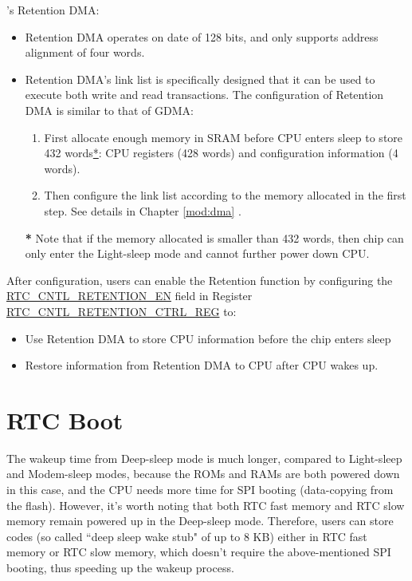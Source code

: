 \documentclass[main\_\_EN.tex]{subfiles}
\begin{document}
\chipname{}'s Retention DMA:

\begin{itemize}
    \item Retention DMA operates on date of 128 bits, and only supports address alignment of four words.
    \item Retention DMA's link list is specifically designed that it can be used to execute both write and read transactions. The configuration of Retention DMA is similar to that of GDMA:
    \begin{enumerate}
        \item First allocate enough memory in SRAM before CPU enters sleep to store 432 words\hyperref[dma-note1]{*}: CPU registers (428 words) and configuration information (4 words).
        \item Then configure the link list according to the memory allocated in the first step. See details in Chapter \ref{mod:dma} \textit{}.
    \end{enumerate}


\begin{tiplisting}\label{dma-note1}
\textbf{*} Note that if the memory allocated is smaller than 432 words, then chip can only enter the Light-sleep mode and cannot further power down CPU.
\end{tiplisting}
\end{itemize}

After configuration, users can enable the Retention function by configuring the  \hyperref[fielddesc:RTCCNTLRETENTIONEN]{RTC\_CNTL\_RETENTION\_EN} field in Register \hyperref[regdesc:RTCCNTLRETENTIONCTRLREG]{RTC\_CNTL\_RETENTION\_CTRL\_REG} to:
\begin{itemize}
    \item Use Retention DMA to store CPU information before the chip enters sleep
    \item Restore information from Retention DMA to CPU after CPU wakes up.
\end{itemize}

\clearpage
\section{RTC Boot}
The wakeup time from Deep-sleep mode is much longer, compared to Light-sleep and Modem-sleep modes, because the ROMs and RAMs are both powered down in this case, and the CPU needs more time for SPI booting (data-copying from the flash). However, it's worth noting that both RTC fast memory and RTC slow memory remain powered up in the Deep-sleep mode. Therefore, users can store codes (so called ``deep sleep wake stub" of up to 8 KB) either in RTC fast memory or RTC slow memory, which doesn't require the above-mentioned  SPI booting, thus speeding up the wakeup process.
\end{document}
